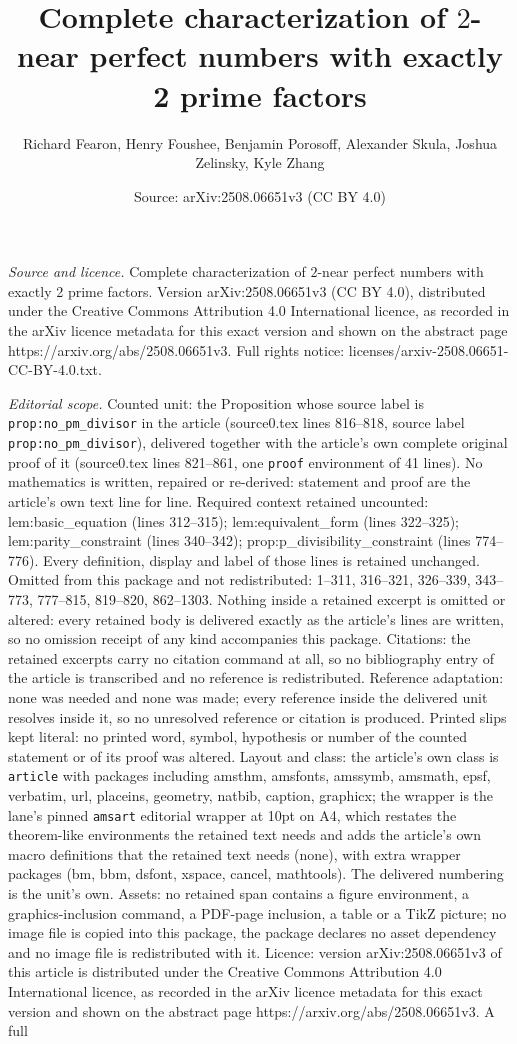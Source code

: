 \documentclass[10pt,a4paper]{amsart}
\title[Complete characterization of $2$-near perfect numbers with e]{Complete characterization of $2$-near perfect numbers with exactly 2 prime factors}
\author{Richard Fearon, Henry Foushee, Benjamin Porosoff, Alexander Skula, Joshua Zelinsky, Kyle Zhang}
\date{Source: arXiv:2508.06651v3 (CC BY 4.0)}
\begin{document}
\maketitle

\noindent\emph{Source and licence.} Complete characterization of $2$-near perfect numbers with exactly 2 prime factors. Version arXiv:2508.06651v3 (CC BY 4.0), distributed under the Creative Commons Attribution 4.0 International licence, as recorded in the arXiv licence metadata for this exact version and shown on the abstract page https://arxiv.org/abs/2508.06651v3. Full rights notice: licenses/arxiv-2508.06651-CC-BY-4.0.txt.\par\smallskip

\noindent\textit{Editorial scope.} Counted unit: the Proposition whose source label is \texttt{prop:no\_pm\_divisor} in the article (source0.tex lines 816--818, source label \texttt{prop:no\_pm\_divisor}), delivered together with the article's own complete original proof of it (source0.tex lines 821--861, one \texttt{proof} environment of 41 lines). No mathematics is written, repaired or re-derived: statement and proof are the article's own text line for line. Required context retained uncounted: lem:basic\_equation (lines 312--315); lem:equivalent\_form (lines 322--325); lem:parity\_constraint (lines 340--342); prop:p\_divisibility\_constraint (lines 774--776). Every definition, display and label of those lines is retained unchanged. Omitted from this package and not redistributed: 1--311, 316--321, 326--339, 343--773, 777--815, 819--820, 862--1303. Nothing inside a retained excerpt is omitted or altered: every retained body is delivered exactly as the article's lines are written, so no omission receipt of any kind accompanies this package. Citations: the retained excerpts carry no citation command at all, so no bibliography entry of the article is transcribed and no reference is redistributed. Reference adaptation: none was needed and none was made; every reference inside the delivered unit resolves inside it, so no unresolved reference or citation is produced. Printed slips kept literal: no printed word, symbol, hypothesis or number of the counted statement or of its proof was altered. Layout and class: the article's own class is \texttt{article} with packages including amsthm, amsfonts, amssymb, amsmath, epsf, verbatim, url, placeins, geometry, natbib, caption, graphicx; the wrapper is the lane's pinned \texttt{amsart} editorial wrapper at 10pt on A4, which restates the theorem-like environments the retained text needs and adds the article's own macro definitions that the retained text needs (none), with extra wrapper packages (bm, bbm, dsfont, xspace, cancel, mathtools). The delivered numbering is the unit's own. Assets: no retained span contains a figure environment, a graphics-inclusion command, a PDF-page inclusion, a table or a TikZ picture; no image file is copied into this package, the package declares no asset dependency and no image file is redistributed with it. Licence: version arXiv:2508.06651v3 of this article is distributed under the Creative Commons Attribution 4.0 International licence, as recorded in the arXiv licence metadata for this exact version and shown on the abstract page https://arxiv.org/abs/2508.06651v3. A full 
\end{document}
